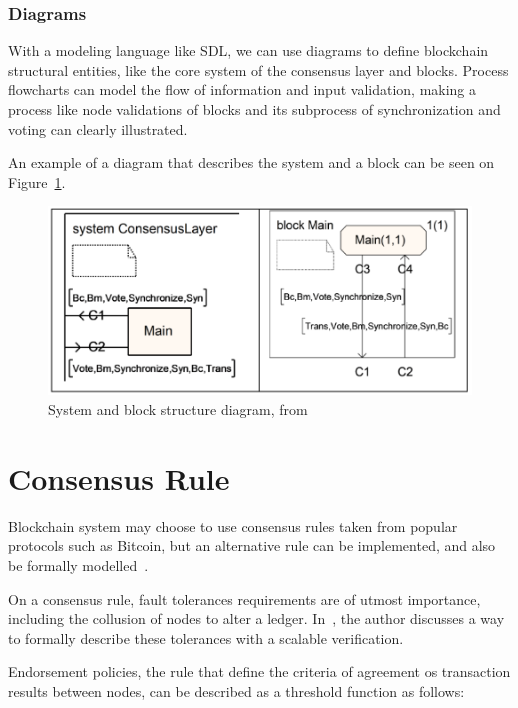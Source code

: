 \documentclass[sigconf, nonacm]{acmart}
\begin{document}
  \subsubsection{Diagrams}
  With a modeling language like SDL, we can use diagrams to define blockchain structural entities, like the core system of the consensus layer
  and blocks. Process flowcharts can model the flow of information and input validation, making a process like
  node validations of blocks and its subprocess of synchronization and voting can clearly illustrated.

  An example of a diagram that describes the system and a block can be seen on Figure~\ref{fig:system-block}.

  \begin{figure}[h]
    \centering
    \includegraphics[width=\linewidth]{system-block-diagram}
    \caption{System and block structure diagram, from~\cite{Duan2018}}
    \label{fig:system-block}
  \end{figure}
  
\section{Consensus Rule}\label{consensusRule}
Blockchain system may choose to use consensus rules taken from popular protocols such as Bitcoin,
but an alternative rule can be implemented, and also be formally modelled~\cite{Kawahara2020}.

On a consensus rule, fault tolerances requirements are of utmost importance, including the collusion of nodes to alter a ledger.
In~\cite{Kawahara2020}, the author discusses a way to formally describe these tolerances with a scalable verification.

Endorsement policies, the rule that define the criteria of agreement os transaction results between nodes, can be described
as a threshold function as follows:
\end{document}
